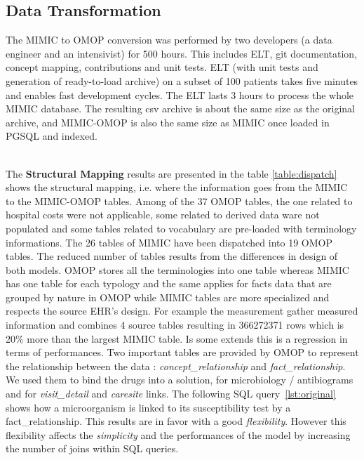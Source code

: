 %
% 
\subsection{Data Transformation}

%
%

The MIMIC to OMOP conversion was performed by two developers (a data engineer
and an intensivist) for 500 hours. This includes ELT, git documentation,
concept mapping, contributions and unit tests. ELT (with unit tests and
generation of ready-to-load archive) on a subset of 100 patients takes five
minutes and enables fast development cycles. The ELT lasts 3 hours to process
the whole MIMIC database. The resulting csv archive is about the same size as
the original archive, and MIMIC-OMOP is also the same size as MIMIC once loaded
in PGSQL and indexed.

~
\\

%
%
The \textbf{Structural Mapping} results are presented in the table
\ref{table:dispatch} shows the structural mapping, i.e. where the information
goes from the MIMIC to the MIMIC-OMOP tables. Among of the 37 OMOP tables, the
one related to hospital costs were not applicable, some related to derived data
ware not populated and some tables related to vocabulary are pre-loaded with
terminology informations. The 26 tables of MIMIC have been dispatched into 19
OMOP tables. The reduced number of tables results from the differences in
design of both models. OMOP stores all the terminologies into one table whereas
MIMIC has one table for each typology and the same applies for facts data that
are grouped by nature in OMOP while MIMIC tables are more specialized and
respects the source EHR's design. For example the measurement gather measured
information and combines 4 source tables resulting in 366272371 rows which is
20\% more than the largest MIMIC table. Is some extends this is a regression in
terms of performances.
Two important tables are provided by OMOP to represent the relationship between
the data : \textit{concept\_relationship} and \textit{fact\_relationship}. We
used them to bind the drugs into a solution, for microbiology / antibiograms
and for \textit{visit\_detail} and \textit{caresite} links. The following SQL
query~\ref{lst:original} shows how a microorganism is linked to its
susceptibility test by a fact\_relationship. This results are in favor with a
good \textit{flexibility}. However this flexibility affects the
\textit{simplicity} and the performances of the model by increasing the number
of joins within SQL queries. 

